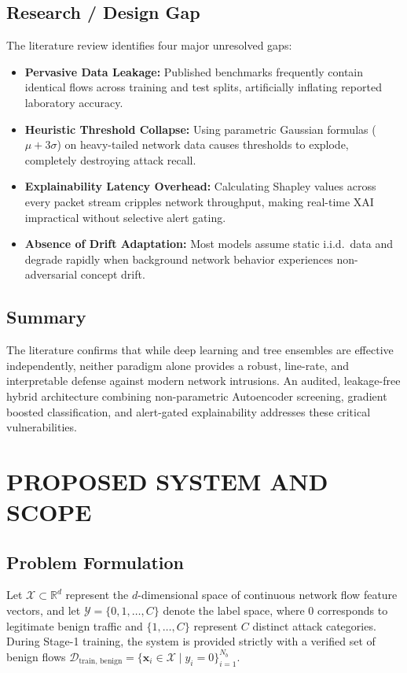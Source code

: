 \documentclass[12pt,a4paper]{report}
\begin{document}
\section{Research / Design Gap}
The literature review identifies four major unresolved gaps:
\begin{itemize}
    \item \textbf{Pervasive Data Leakage:} Published benchmarks frequently contain identical flows across training and test splits, artificially inflating reported laboratory accuracy.
    \item \textbf{Heuristic Threshold Collapse:} Using parametric Gaussian formulas ($\mu + 3\sigma$) on heavy-tailed network data causes thresholds to explode, completely destroying attack recall.
    \item \textbf{Explainability Latency Overhead:} Calculating Shapley values across every packet stream cripples network throughput, making real-time XAI impractical without selective alert gating.
    \item \textbf{Absence of Drift Adaptation:} Most models assume static i.i.d.\ data and degrade rapidly when background network behavior experiences non-adversarial concept drift.
\end{itemize}

\section{Summary}
The literature confirms that while deep learning and tree ensembles are effective independently, neither paradigm alone provides a robust, line-rate, and interpretable defense against modern network intrusions. An audited, leakage-free hybrid architecture combining non-parametric Autoencoder screening, gradient boosted classification, and alert-gated explainability addresses these critical vulnerabilities.

\chapter{PROPOSED SYSTEM AND SCOPE}

\section{Problem Formulation}
Let $\mathcal{X} \subset \mathbb{R}^d$ represent the $d$-dimensional space of continuous network flow feature vectors, and let $\mathcal{Y} = \{0, 1, \dots, C\}$ denote the label space, where $0$ corresponds to legitimate benign traffic and $\{1, \dots, C\}$ represent $C$ distinct attack categories. During Stage-1 training, the system is provided strictly with a verified set of benign flows $\mathcal{D}_{\text{train, benign}} = \{\mathbf{x}_i \in \mathcal{X} \mid y_i = 0\}_{i=1}^{N_b}$.
\end{document}
